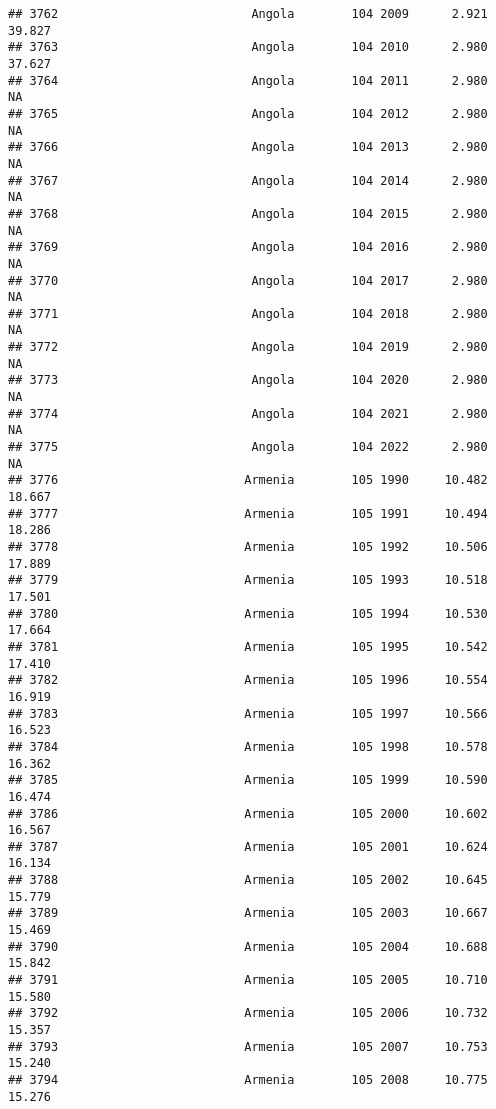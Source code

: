 \documentclass[
]{article}
\begin{document}
\begin{verbatim}
## 3762                           Angola        104 2009      2.921     39.827
## 3763                           Angola        104 2010      2.980     37.627
## 3764                           Angola        104 2011      2.980         NA
## 3765                           Angola        104 2012      2.980         NA
## 3766                           Angola        104 2013      2.980         NA
## 3767                           Angola        104 2014      2.980         NA
## 3768                           Angola        104 2015      2.980         NA
## 3769                           Angola        104 2016      2.980         NA
## 3770                           Angola        104 2017      2.980         NA
## 3771                           Angola        104 2018      2.980         NA
## 3772                           Angola        104 2019      2.980         NA
## 3773                           Angola        104 2020      2.980         NA
## 3774                           Angola        104 2021      2.980         NA
## 3775                           Angola        104 2022      2.980         NA
## 3776                          Armenia        105 1990     10.482     18.667
## 3777                          Armenia        105 1991     10.494     18.286
## 3778                          Armenia        105 1992     10.506     17.889
## 3779                          Armenia        105 1993     10.518     17.501
## 3780                          Armenia        105 1994     10.530     17.664
## 3781                          Armenia        105 1995     10.542     17.410
## 3782                          Armenia        105 1996     10.554     16.919
## 3783                          Armenia        105 1997     10.566     16.523
## 3784                          Armenia        105 1998     10.578     16.362
## 3785                          Armenia        105 1999     10.590     16.474
## 3786                          Armenia        105 2000     10.602     16.567
## 3787                          Armenia        105 2001     10.624     16.134
## 3788                          Armenia        105 2002     10.645     15.779
## 3789                          Armenia        105 2003     10.667     15.469
## 3790                          Armenia        105 2004     10.688     15.842
## 3791                          Armenia        105 2005     10.710     15.580
## 3792                          Armenia        105 2006     10.732     15.357
## 3793                          Armenia        105 2007     10.753     15.240
## 3794                          Armenia        105 2008     10.775     15.276

\end{verbatim}
\end{document}
